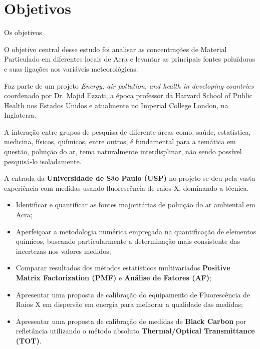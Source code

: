 \section{Objetivos}

%
%
Os objetivos 

O objetivo central desse estudo foi analisar as concentrações de Material 
Particulado em diferentes locais de Acra e levantar as principais fontes 
poluídoras e suas ligações aos variáveis meteorológicas. 

Faz parte de um projeto \textit{Energy, air pollution, and health 
in developing countries} coordenado por Dr. Majid Ezzati, 
a época professor da Harvard School of Public Health nos 
Estados Unidos e atualmente no Imperial College London, 
na Inglaterra.  

A interação entre grupos de pesquisa de diferente áreas como, saúde, 
estatística, medicina, físicos, químicos, entre outros, é fundamental
para a temática em questão, poluição do ar, tema naturalmente  
interdisplinar, não sendo possível pesquisá-lo isoladamente. 

A entrada da \textbf{Universidade de São Paulo (USP)} no projeto se deu pela
vasta experiência com medidas usando fluorescência de raios X, dominando a técnica.


\begin{itemize}
  \item Identificar e quantificar as fontes majoritárias de poluição do ar ambiental em Acra;
  \item Aperfeiçoar a metodologia numérica empregada na quantificação de elementos químicos, 
        buscando particularmente a determinação mais consistente das incertezas nos valores medidos;
  \item Comparar resultados dos métodos estatísticos multivariados
        \textbf{Positive Matrix Factorization (PMF)} e \textbf{Análise de Fatores (AF)};
  \item Apresentar uma proposta de calibração do equipamento de Fluorescência de Raios X
        em dispersão em energia para melhorar a qualidade das medidas;
  \item Apresentar uma proposta de calibração de medidas de \textbf{Black Carbon} por refletância
        utilizando o método absoluto \textbf{Thermal/Optical Transmittance (TOT)}.
\end{itemize}




